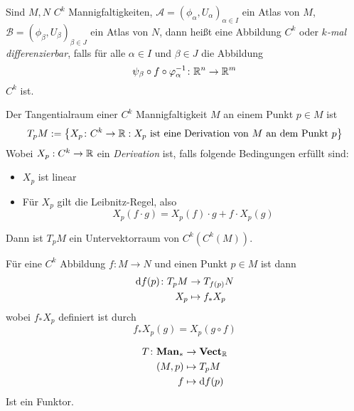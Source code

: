 \begin{definition}[Differenzierbarkeit]
    Sind $M, N$ $C^k$ Mannigfaltigkeiten, 
    $\mathcal{A} = (\phi_{\alpha}, U_{\alpha})_{\alpha \in I}$ ein Atlas von $M$, 
    $\mathcal{B} = (\phi_{\beta}, U_{\beta})_{\beta \in J}$ ein Atlas von $N$,
    dann heißt eine Abbildung $C^k$ oder \textit{$k$-mal differenzierbar}, falls für alle 
    $\alpha \in I$ und $\beta \in J$ die Abbildung
    \[ \psi_{\beta} \circ f \circ \varphi_{\alpha}^{-1} \colon { \mathbb R }^n \to { \mathbb R }^m \]
    $C^k$ ist.
\end{definition}

\begin{definition}[Tangentialraum]
    Der Tangentialraum einer $C^k$ Mannigfaltigkeit $M$ an einem Punkt $p \in M$ ist
    \[ T_pM := \left\{ X_p \colon C^{k} \to { \mathbb R } : X_p 
        \text{ ist eine Derivation von $M$ an dem Punkt $p$} \right\} \]
    Wobei $X_p: C^{k} \to { \mathbb R }$ ein \textit{Derivation} ist, falls folgende Bedingungen erfüllt
    sind:
    \begin{itemize}
        \item $X_p$ ist linear
        \item Für $X_p$ gilt die Leibnitz-Regel, also
            \[ X_p (f \cdot g) = X_p (f) \cdot g + f \cdot X_p (g) \]
    \end{itemize}
    Dann ist $T_pM$ ein Untervektorraum von $C^k(C^k(M))$.

    Für eine $C^k$ Abbildung $f \colon M \to N$  und einen Punkt $p \in M$ ist dann 
    \begin{align*}
        { \operatorname{d} } f (p) \colon T_pM & \to T_{f(p)}N \\
        X_p & \mapsto f_* X_p
    \end{align*}
    wobei $f_*X_p$ definiert ist durch
    \[ f_*X_p (g) = X_p (g \circ f) \]
\end{definition}

\begin{remark}
    \begin{align*}
        T \colon \mathbf{Man}_{*} & \to \mathbf{Vect}_{{ \mathbb R }} \\
        (M, p) & \mapsto T_pM \\
        f & \mapsto { \operatorname{d} } f (p)
    \end{align*}
    Ist ein Funktor.
\end{remark}


